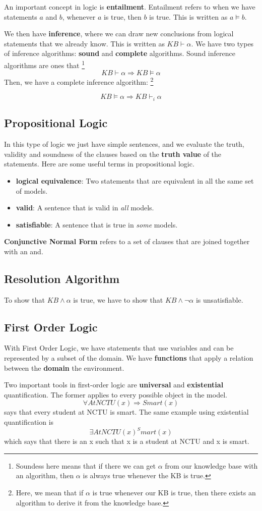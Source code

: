 \documentclass{tufte-handout}
\begin{document}
An important concept in logic is \textbf{entailment}. 
Entailment refers to when we have statements $a$ and $b$, whenever $a$ is true, then $b$ is true.
This is written as $a\models b$.

We then have \textbf{inference}, where we can draw new conclusions from logical statements that we 
	already know.
This is written as $KB\vdash \alpha$.
We have two types of inference algorithms: \textbf{sound} and \textbf{complete} algorithms.
Sound inference algorithms are ones that
\footnote{Soundess here means that if there we can get $\alpha$ from our knowledge base with an algorithm,
	then $\alpha$ is always true whenever the KB is true.}
\[ KB\vdash\alpha\Rightarrow KB\models\alpha\]
Then, we have a complete inference algorithm:
\footnote{Here, we mean that if $\alpha$ is true whenever our KB is true, then there exists an algorithm
	to derive it from the knowledge base.}

\[KB\models\alpha\Rightarrow KB\vdash_{i}\alpha\]
\subsection{Propositional Logic}
In this type of logic we just have simple sentences, and we evaluate the truth, validity and soundness of
	the clauses based on the \textbf{truth value} of the statements.
Here are some useful terms in propositional logic.
\begin{itemize}
		\item \textbf{logical equivalence}: Two statements that are equivalent in all the same 
				set of models.
		\item \textbf{valid}: A sentence that is valid in \textit{all} models.
		\item \textbf{satisfiable}: A sentence that is true in \textit{some} models.
\end{itemize}

\textbf{Conjunctive Normal Form} refers to a set of clauses that are joined together with an and.

\subsection{Resolution Algorithm}
To show that  $KB \land \alpha$ is true, we have to show that $KB \land \neg \alpha$ is unsatisfiable.

\subsection{First Order Logic}
With First Order Logic, we have statements that use variables and can be represented by a subset of the 
	domain.
We have \textbf{functions} that apply a relation between the \textbf{domain} the environment. 

Two important tools in first-order logic are \textbf{universal} and \textbf{existential} quantification.
The former applies to every possible object in the model.
\[ \forall AtNCTU(x) \Rightarrow Smart(x)\]
says that every student at NCTU is smart.
The same example using existential quantification is
\[ \exists AtNCTU(x) ^ Smart(x)\]
which says that there is an x such that x is a student at NCTU and x is smart.
\end{document}

